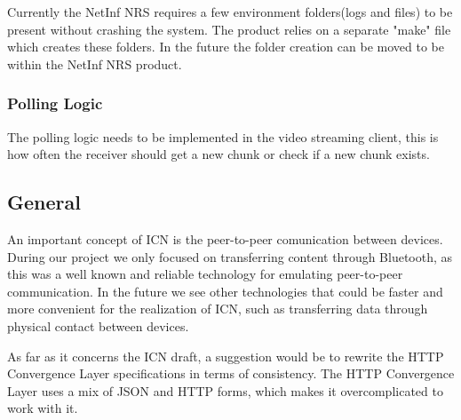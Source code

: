Currently the NetInf NRS requires a few environment folders(logs and files) to be present without crashing the system. The product relies on a separate "make" file which creates these folders. In the future the folder creation can be moved to be within the NetInf NRS product.

\subsubsection{Polling Logic}

The polling logic needs to be implemented in the video streaming client, this is how often the receiver should get a new chunk or check if a new chunk exists.  

\subsection{General}

An important concept of ICN is the peer-to-peer comunication between devices. 
During our project we only focused on transferring content
through Bluetooth, as this was a well known and reliable technology for emulating peer-to-peer communication.
In the future we see other technologies that could be faster and more convenient for the realization of ICN,
such as transferring data through physical contact between devices.

As far as it concerns the ICN draft, a suggestion would be to rewrite the HTTP Convergence Layer specifications
in terms of consistency. The HTTP Convergence Layer uses a mix of JSON and HTTP forms, which makes it
overcomplicated to work with it.
